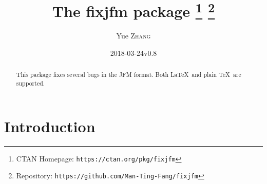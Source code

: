 \documentclass[a4paper]{article}
\newcommand\NormalSans{\normalfont\sffamily}
\newcommand\pkg[1]{{\protect\NormalSans#1}}
\begin{document}
\title{The \pkg{fixjfm} package%
  \thanks{CTAN Homepage: \texttt{https://ctan.org/pkg/fixjfm}}
  \thanks{Repository: \texttt{https://github.com/Man-Ting-Fang/fixjfm}}}
\author{Yue \textsc{Zhang}}
\date{2018-03-24\quad v0.8}

\maketitle

\begin{abstract}
This package fixes several bugs in the JFM format. Both \LaTeX\ and plain \TeX\
are supported.
\end{abstract}

\section{Introduction}
\end{document}
